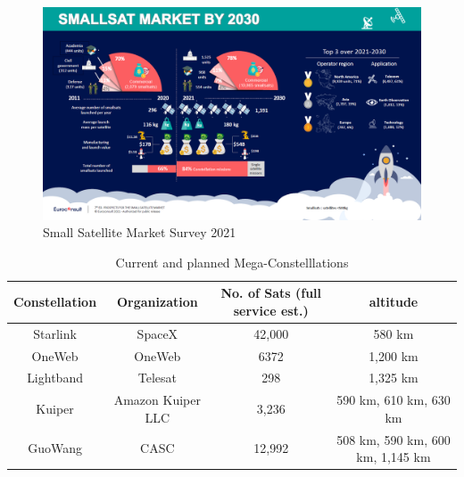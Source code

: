 \begin{figure}[ht]
    \centering
    \includegraphics[width=1\textwidth]{Figures/EuroconsultSmallSatMarketBy2030.PNG}
    \caption{Small Satellite Market Survey 2021 \cite{euroConsult21}}
    \label{fig:smallSatMarket}
\end{figure}



\begin{table}[!ht]
    \centering
    \caption{Current and planned Mega-Constelllations}
    \label{table:constellation}
    \resizebox{\textwidth}{!} {%
    \begin{tabular}{||c c c c||} 
    \hline
    Constellation & Organization & No. of Sats (full service est.) & altitude \\ [0.5ex] 
    \hline\hline
    Starlink\footnotemark[2]{} & SpaceX &  42,000 & 580 km \\ 
    \hline
    OneWeb\footnotemark[3]{} & OneWeb & 6372 & 1,200 km \\
    \hline
    Lightband\footnotemark[4]{} & Telesat & 298 & 1,325 km \\
    \hline
    Kuiper\footnotemark[5]{} & Amazon Kuiper LLC & 3,236 & 590 km, 610 km, 630 km \\
    \hline
    GuoWang\footnotemark[6]{} & CASC & 12,992 & 508 km, 590 km, 600 km, 1,145 km \\ [1ex]
    \hline
    \end{tabular}
    }
\end{table}

